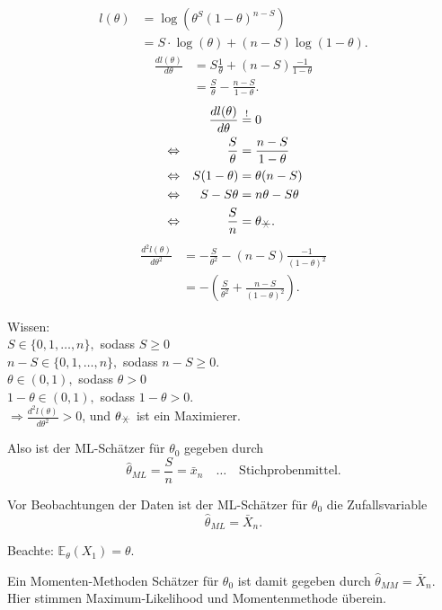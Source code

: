 \documentclass{tstextbook}
\newcommand{\E}{\mathbb E}
\begin{document}
\begin{example}
	\[
	\begin{aligned}
		l(\theta) & = \log\left(\theta^S(1-\theta)^{n-S}\right) \\
		& = S\cdot \log(\theta) + (n-S)\log(1-\theta).
	\end{aligned}
	\]
\vspace{0.5cm}	
	\[
	\begin{aligned}
		\frac{dl(\theta)}{d\theta} & = S \frac{1}{\theta} + (n-S)\frac{-1}{1-\theta} \\
		& = \frac{S}{\theta} -\frac{n-S}{1-\theta}.		
	\end{aligned}
	\]
\vspace{0.5cm}	
	\[
	\begin{aligned}
		&& \frac{dl(\theta)}{d\theta} & \overset{!}{=} 0 \\
		& \Leftrightarrow & \frac{S}{\theta} & = \frac{n-S}{1-\theta} \\
		& \Leftrightarrow & S(1-\theta) & = \theta (n-S) \\
		& \Leftrightarrow & S -S\theta & = n\theta - S\theta \\
		& \Leftrightarrow & \frac{S}{n} & = \theta_{\hexstar}.
	\end{aligned}
	\]
\vspace{0.5cm}	
	\[
	\begin{aligned}
		\frac{d^2l(\theta)}{d\theta^2} & = -\frac{S}{\theta^2} -(n-S)\frac{-1}{(1-\theta)^2}\\
		& = -\left(\frac{S}{\theta^2}+\frac{n-S}{(1-\theta)^2}\right). 
	\end{aligned}
	\]
	
	Wissen: \\
	
	$ S\in\lbrace0,1,\ldots,n\rbrace, $ sodass $ S \ge 0 $ \\
	
	$ n-S\in\lbrace0,1,\ldots,n\rbrace, $ sodass $ n-S \ge 0 $.\\
	
	$ \theta\in(0,1), $ sodass $ \theta > 0 $ \\
	
	$ 1-\theta\in(0,1), $ sodass $ 1-\theta > 0 $. \\
	
	$ \Rightarrow \frac{d^2l(\theta)}{d\theta^2} > 0 $, und $ \theta_{\hexstar} $ ist ein Maximierer.
	
	Also ist der ML-Schätzer für $ \theta_0 $ gegeben durch 
	\[
	\hat{\theta}_{ML} = \frac{S}{n} = \bar{x}_n \quad \ldots \quad \text{Stichprobenmittel}.
	\]
	
	Vor Beobachtungen der Daten ist der ML-Schätzer für $ \theta_0 $ die Zufallsvariable 
	\[
	\hat{\theta}_{ML} = \bar{X}_n.
	\]
	
	Beachte: $ \E_{\theta}(X_1)=\theta $. 
	
	Ein Momenten-Methoden Schätzer für $ \theta_0 $ ist damit gegeben durch $ \hat{\theta}_{MM} = \bar{X}_n $. Hier stimmen Maximum-Likelihood und Momentenmethode überein.
\end{example}
\end{document}
